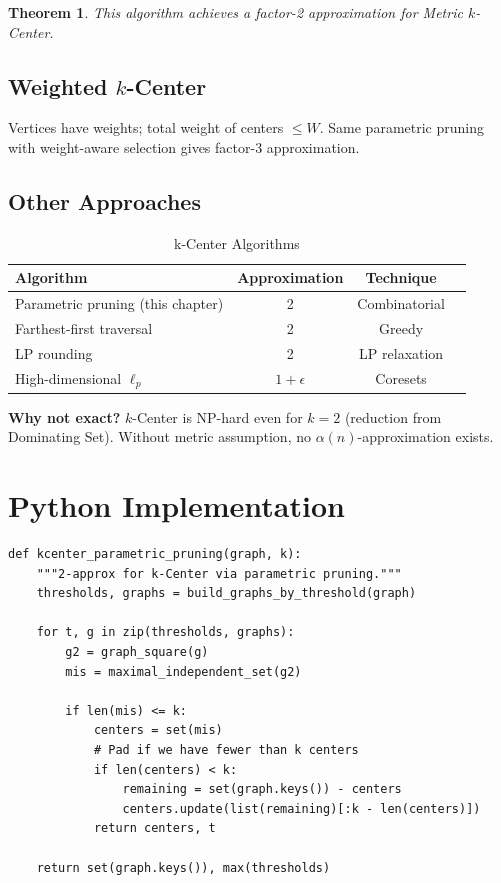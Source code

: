 \documentclass[11pt,oneside]{book}
\newtheorem{theorem}{Theorem}[chapter]
\begin{document}
\begin{theorem}
This algorithm achieves a factor-2 approximation for Metric $k$-Center.
\end{theorem}

\subsection{Weighted $k$-Center}

Vertices have weights; total weight of centers $\leq W$. Same parametric pruning with weight-aware selection gives factor-3 approximation.

\subsection{Other Approaches}

\begin{table}[H]
\centering
\caption{k-Center Algorithms}
\begin{tabular}{lccc}
\toprule
Algorithm & Approximation & Technique \\
\midrule
Parametric pruning (this chapter) & 2 & Combinatorial \\
Farthest-first traversal & 2 & Greedy \\
LP rounding & 2 & LP relaxation \\
High-dimensional $\ell_p$ & $1+\epsilon$ & Coresets \\
\bottomrule
\end{tabular}
\end{table}

\textbf{Why not exact?} $k$-Center is NP-hard even for $k=2$ (reduction from Dominating Set). Without metric assumption, no $\alpha(n)$-approximation exists.

\section{Python Implementation}

\begin{lstlisting}[style=python, caption=k-Center Parametric Pruning]
def kcenter_parametric_pruning(graph, k):
    """2-approx for k-Center via parametric pruning."""
    thresholds, graphs = build_graphs_by_threshold(graph)
    
    for t, g in zip(thresholds, graphs):
        g2 = graph_square(g)
        mis = maximal_independent_set(g2)
        
        if len(mis) <= k:
            centers = set(mis)
            # Pad if we have fewer than k centers
            if len(centers) < k:
                remaining = set(graph.keys()) - centers
                centers.update(list(remaining)[:k - len(centers)])
            return centers, t
    
    return set(graph.keys()), max(thresholds)
\end{lstlisting}
\end{document}

